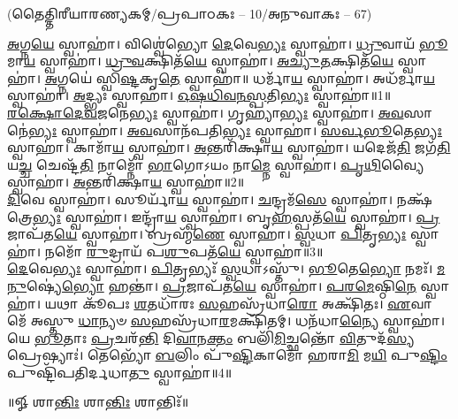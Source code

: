 
\vspace{-1ex}
\centerline{\scriptsize (𑌤𑍈𑌤𑍍𑌤𑌿𑌰𑍀𑌯𑌾𑌰𑌣𑍍𑌯𑌕𑌮𑍍/𑌪𑍍𑌰𑌪𑌾𑌠𑌕𑌃 – 10/𑌅𑌨𑍁𑌵𑌾𑌕𑌃 – 67)}
\-\ul{𑌅}\-𑌗𑍍𑌨\-\ul{𑌯𑍇} 𑌸𑍍𑌵𑌾𑌹𑌾॑। 𑌵𑌿𑌶𑍍𑌵𑍇॑𑌭𑍍𑌯𑍋 \ul{𑌦𑍇}\-𑌵𑍇\-\ul{𑌭𑍍𑌯𑌃} 𑌸𑍍𑌵𑌾𑌹𑌾॑। \ul{𑌧𑍍𑌰𑍁}\-𑌵𑌾𑌯᳴ \ul{𑌭𑍂}\-𑌮𑌾\-\ul{𑌯} 𑌸𑍍𑌵𑌾𑌹𑌾॑। \ul{𑌧𑍍𑌰𑍁}\-\-\ul{𑌵}\-𑌕𑍍𑌷𑌿𑌤᳴\-\ul{𑌯𑍇} 𑌸𑍍𑌵𑌾𑌹𑌾॑। \ul{𑌅}\-\-\ul{𑌚𑍍𑌯𑍁}\-\-\ul{𑌤}\-𑌕𑍍𑌷𑌿𑌤᳴\-\ul{𑌯𑍇} 𑌸𑍍𑌵𑌾𑌹𑌾॑। \ul{𑌅}\-𑌗𑍍𑌨𑌯𑍇॑ 𑌸𑍍𑌵𑌿\-\ul{𑌷𑍍𑌟}\-𑌕𑍃\-\ul{𑌤𑍇} 𑌸𑍍𑌵𑌾𑌹𑌾॑॥ 𑌧𑌰𑍍𑌮𑌾᳴\-\ul{𑌯} 𑌸𑍍𑌵𑌾𑌹𑌾॑। 𑌅𑌧᳴𑌰𑍍𑌮𑌾\-\ul{𑌯} 𑌸𑍍𑌵𑌾𑌹𑌾॑। \ul{𑌅}\-𑌦𑍍𑌭𑍍𑌯𑌃 𑌸𑍍𑌵𑌾𑌹𑌾॑। \ul{𑌓}\-\-\ul{𑌷}\-\-\ul{𑌧𑌿}\-\-\ul{𑌵}\-\-\ul{𑌨}\-\-\ul{𑌸𑍍𑌪}\-𑌤𑌿\-\ul{𑌭𑍍𑌯𑌃} 𑌸𑍍𑌵𑌾𑌹𑌾॑॥1॥ \\
\-\ul{𑌰}\-\-\ul{𑌕𑍍𑌷𑍋}\-\-\ul{𑌦𑍇}\-\-\ul{𑌵}\-\-\ul{𑌜}\-𑌨𑍇\-\ul{𑌭𑍍𑌯𑌃} 𑌸𑍍𑌵𑌾𑌹𑌾॑। 𑌗𑍃𑌹𑍍𑌯𑌾॑\-\ul{𑌭𑍍𑌯𑌃} 𑌸𑍍𑌵𑌾𑌹𑌾॑। \ul{𑌅}\-\-\ul{𑌵}\-𑌸𑌾𑌨𑍇॑\-\ul{𑌭𑍍𑌯𑌃} 𑌸𑍍𑌵𑌾𑌹𑌾॑। \ul{𑌅}\-\-\ul{𑌵}\-𑌸𑌾𑌨᳴𑌪𑌤𑌿\-\ul{𑌭𑍍𑌯𑌃} 𑌸𑍍𑌵𑌾𑌹𑌾॑। \ul{𑌸}\-\-\ul{𑌰𑍍𑌵}\-\-\ul{𑌭𑍂}\-𑌤𑍇\-\ul{𑌭𑍍𑌯𑌃} 𑌸𑍍𑌵𑌾𑌹𑌾॑। 𑌕𑌾𑌮𑌾᳴\-\ul{𑌯} 𑌸𑍍𑌵𑌾𑌹𑌾॑। \ul{𑌅}\-𑌨𑍍𑌤𑌰𑌿᳴𑌕𑍍𑌷𑌾\-\ul{𑌯} 𑌸𑍍𑌵𑌾𑌹𑌾॑। 𑌯𑌦𑍇𑌜᳴\-\ul{𑌤𑌿} 𑌜𑌗᳴\-\ul{𑌤𑌿} 𑌯\-\ul{𑌚𑍍𑌚} 𑌚𑍇𑌷𑍍𑌟᳴\-\ul{𑌤𑌿} 𑌨𑌾𑌮𑍍𑌨𑍋᳴ \ul{𑌭𑌾}\-𑌗𑍋𑌽𑌯𑌂 𑌨𑌾\-\ul{𑌮𑍍𑌨𑍇} 𑌸𑍍𑌵𑌾𑌹𑌾॑। \ul{𑌪𑍃}\-\-\ul{𑌥𑌿}\-𑌵𑍍𑌯𑍈 𑌸𑍍𑌵𑌾𑌹𑌾॑। \ul{𑌅}\-𑌨𑍍𑌤𑌰𑌿᳴𑌕𑍍𑌷𑌾\-\ul{𑌯} 𑌸𑍍𑌵𑌾𑌹𑌾॑॥2॥ \\
\-\ul{𑌦𑌿}\-𑌵𑍇 𑌸𑍍𑌵𑌾𑌹𑌾॑। 𑌸𑍂𑌰𑍍𑌯𑌾᳴\-\ul{𑌯} 𑌸𑍍𑌵𑌾𑌹𑌾॑। \ul{𑌚}\-𑌨𑍍𑌦𑍍𑌰𑌮᳴\-\ul{𑌸𑍇} 𑌸𑍍𑌵𑌾𑌹𑌾॑। 𑌨𑌕𑍍𑌷᳴𑌤𑍍𑌰𑍇\-\ul{𑌭𑍍𑌯𑌃} 𑌸𑍍𑌵𑌾𑌹𑌾॑। 𑌇𑌨𑍍𑌦𑍍𑌰𑌾᳴\-\ul{𑌯} 𑌸𑍍𑌵𑌾𑌹𑌾॑। 𑌬𑍃\-\ul{𑌹}\-𑌸𑍍𑌪𑌤᳴\-\ul{𑌯𑍇} 𑌸𑍍𑌵𑌾𑌹𑌾॑। \ul{𑌪𑍍𑌰}\-𑌜𑌾𑌪᳴𑌤\-\ul{𑌯𑍇} 𑌸𑍍𑌵𑌾𑌹𑌾॑। 𑌬𑍍𑌰𑌹𑍍𑌮᳴\-\ul{𑌣𑍇} 𑌸𑍍𑌵𑌾𑌹𑌾॑। \ul{𑌸𑍍𑌵}\-𑌧𑌾 \ul{𑌪𑌿}\-𑌤𑍃\-\ul{𑌭𑍍𑌯𑌃} 𑌸𑍍𑌵𑌾𑌹𑌾॑। 𑌨𑌮𑍋᳴ \ul{𑌰𑍁}\-𑌦𑍍𑌰𑌾𑌯᳴ 𑌪\-\ul{𑌶𑍁}\-𑌪𑌤᳴\-\ul{𑌯𑍇} 𑌸𑍍𑌵𑌾𑌹𑌾॑॥3॥\\
  \ul{𑌦𑍇}\-𑌵𑍇\-\ul{𑌭𑍍𑌯𑌃} 𑌸𑍍𑌵𑌾𑌹𑌾॑। \ul{𑌪𑌿}\-𑌤𑍃𑌭𑍍𑌯𑌃᳴ \ul{𑌸𑍍𑌵}\-𑌧𑌾𑌽𑌸𑍍𑌤𑍁᳴। \ul{𑌭𑍂}\-𑌤𑍇\-\ul{𑌭𑍍𑌯𑍋} 𑌨𑌮𑌃᳴। \ul{𑌮}\-\-\ul{𑌨𑍁}\-𑌷𑍍𑌯𑍇॑\-\ul{𑌭𑍍𑌯𑍋} 𑌹𑌨𑍍𑌤𑌾॑। \ul{𑌪𑍍𑌰}\-𑌜𑌾𑌪᳴𑌤\-\ul{𑌯𑍇} 𑌸𑍍𑌵𑌾𑌹𑌾॑। \ul{𑌪}\-\-\ul{𑌰}\-\-\ul{𑌮𑍇}\-𑌷𑍍𑌠𑌿\-\ul{𑌨𑍇} 𑌸𑍍𑌵𑌾𑌹𑌾॑। 𑌯𑌥𑌾 𑌕𑍂᳴𑌪𑌃 \ul{𑌶}\-𑌤𑌧𑌾᳴𑌰𑌃 \ul{𑌸}\-𑌹𑌸𑍍𑌰᳴𑌧𑌾\-\ul{𑌰𑍋} 𑌅𑌕𑍍𑌷𑌿᳴𑌤𑌃। \ul{𑌏}\-𑌵𑌾 𑌮𑍇᳴ 𑌅𑌸𑍍𑌤𑍁 \ul{𑌧𑌾}\-𑌨𑍍𑌯𑍞 \ul{𑌸}\-𑌹𑌸𑍍𑌰᳴𑌧𑌾\-\ul{𑌰}\-𑌮𑌕𑍍𑌷𑌿᳴𑌤𑌮𑍍। 𑌧𑌨᳴𑌧𑌾\-\ul{𑌨𑍍𑌯𑍈} 𑌸𑍍𑌵𑌾𑌹𑌾॑। 𑌯𑍇 \ul{𑌭𑍂}\-𑌤𑌾𑌃 \ul{𑌪𑍍𑌰}\-𑌚𑌰᳴\-\ul{𑌨𑍍𑌤𑌿} 𑌦𑌿\-\ul{𑌵𑌾}\-𑌨\-\ul{𑌕𑍍𑌤𑌂} 𑌬𑌲𑌿᳴\-\ul{𑌮𑌿}\-𑌚𑍍𑌛𑌨𑍍𑌤𑍋᳴ \ul{𑌵𑌿}\-𑌤𑍁𑌦᳴\-\ul{𑌸𑍍𑌯} 𑌪𑍍𑌰𑍇𑌷𑍍𑌯𑌾𑌃॑। 𑌤𑍇𑌭𑍍𑌯𑍋᳴ \ul{𑌬}\-𑌲𑌿𑌂 𑌪𑍁᳴\-\ul{𑌷𑍍𑌟𑌿}\-𑌕𑌾𑌮𑍋᳴ 𑌹𑌰𑌾\-\ul{𑌮𑌿} 𑌮\-\ul{𑌯𑌿} 𑌪𑍁\-\ul{𑌷𑍍𑌟𑌿𑌂} 𑌪𑍁𑌷𑍍𑌟𑌿᳴𑌪𑌤𑌿𑌰𑍍𑌦𑌧𑌾\-\ul{𑌤𑍁} 𑌸𑍍𑌵𑌾𑌹𑌾॑॥4॥ 

\centerline{॥𑍐 𑌶𑌾\-\ul{𑌨𑍍𑌤𑌿𑌃} 𑌶𑌾\-\ul{𑌨𑍍𑌤𑌿𑌃} 𑌶𑌾𑌨𑍍𑌤𑌿𑌃᳴॥}
